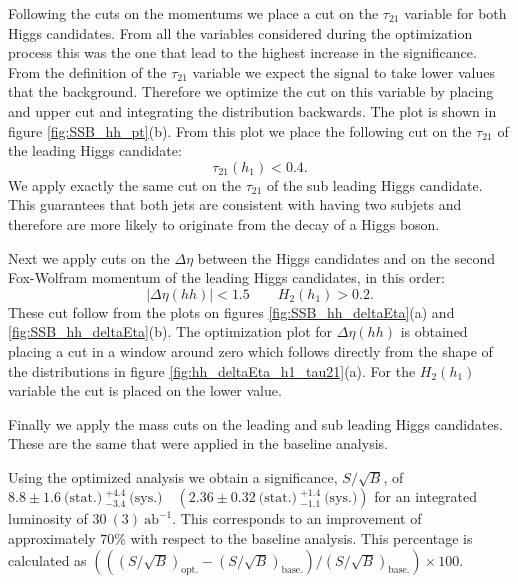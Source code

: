 Following the cuts on the momentums we place a cut on the $\tau_{21}$ variable for both Higgs candidates. From all the variables considered during the optimization process this was the one that lead to the highest increase in the significance. From the definition of the $\tau_{21}$ variable we expect the signal to take lower values that the background. Therefore we optimize the cut on this variable by placing and upper cut and integrating the distribution backwards. The plot is shown in figure \ref{fig:SSB_hh_pt}(b). From this plot we place the following cut on the $\tau_{21}$ of the leading Higgs candidate:
\begin{equation}
	\tau_{21}(h_1)<0.4.
\end{equation}
We apply exactly the same cut on the $\tau_{21}$ of the sub leading Higgs candidate. This guarantees that both jets are consistent with having two subjets and therefore are more likely to originate from the decay of a Higgs boson.

Next we apply cuts on the $\Delta\eta$ between the Higgs candidates and on the second Fox-Wolfram momentum of the leading Higgs candidates, in this order:
\begin{equation}
	|\Delta\eta(hh)|<1.5 \qquad H_2(h_1)>0.2.
\end{equation} 
These cut follow from the plots on figures \ref{fig:SSB_hh_deltaEta}(a) and \ref{fig:SSB_hh_deltaEta}(b). The optimization plot for $\Delta\eta(hh)$ is obtained placing a cut in a window around zero which follows directly from the shape of the distributions in figure \ref{fig:hh_deltaEta_h1_tau21}(a). For the $H_2(h_1)$ variable the cut is placed on the lower value.

Finally we apply the mass cuts on the leading and sub leading Higgs candidates. These are the same that were applied in the baseline analysis.

Using the optimized analysis we obtain a significance, $S/\sqrt{B}$, of $8.8\pm 1.6~\text{(stat.)}~^{+4.4}_{-3.4}~\text{(sys.)}\quad (2.36\pm 0.32~\text{(stat.)}~^{+1.4}_{-1.1}~\text{(sys.)})$ for an integrated luminosity of $30~(3)~\text{ab}^{-1}$. This corresponds to an improvement of approximately $70\%$ with respect to the baseline analysis. This percentage is calculated as $(((S/\sqrt{B})_{\text{opt.}}-(S/\sqrt{B})_{\text{base.}})/(S/\sqrt{B})_{\text{base.}})\times 100$.

